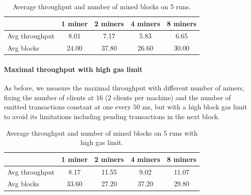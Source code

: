 \begin{table}[h]
  \centering
  \begin{tabular}{lcccc}
    \hline
    & 1 miner & 2 miners & 4 miners & 8 miners \\ \hline
    Avg throughput & 8.01 & 7.17 & 5.83 & 6.65 \\ \hline
    Avg blocks & 24.00 & 37.80 & 26.60 & 30.00 \\ \hline
  \end{tabular}
  \caption{Average throughput and number of mined blocks on 5 runs.}
  \label{tab:max-troughput}
\end{table}


\paragraph{Maximal throughput with high gas limit}
\label{sec:max-throughput-high-gaslimit}
As before, we measure the maximal throughput with different number of miners,
fixing the number of clients at $16$ (2 clients per machine) and the number of
emitted transactions constant at one every $50$ ms, but with a high block gas
limit to avoid its limitations including pending transactions in the next block.

\begin{table}[h]
  \centering
  \begin{tabular}{lcccc}
    \hline
    & 1 miner & 2 miners & 4 miners & 8 miners \\ \hline
    Avg throughput & 8.17 & 11.55 & 9.02 & 11.07 \\ \hline
    Avg blocks & 33.60 & 27.20 & 37.20 & 29.80 \\ \hline
  \end{tabular}
  \caption{Average throughput and number of mined blocks on 5 runs with high gas limit.}
  \label{tab:max-troughput-high-gaslimit}
\end{table}